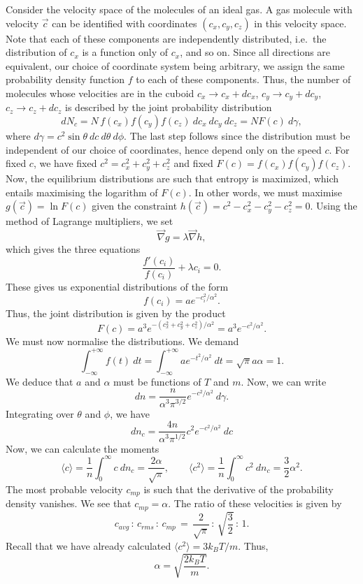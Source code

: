 \documentclass[11pt]{article}
\newcommand\ve[1]{\vec{#1}}
\newcommand\grad[1]{\ve{\nabla}#1}
\newcommand\E[1]{\langle #1 \rangle}
\theoremstyle{definition}
\theoremstyle{remark}
\numberwithin{equation}{section}
\begin{document}
    Consider the velocity space of the molecules of an ideal gas. A gas molecule
    with velocity $\ve{c}$ can be identified with coordinates $(c_x, c_y, c_z)$ in
    this velocity space. Note that each of these components are independently
    distributed, i.e.\ the distribution of $c_x$ is a function only of $c_x$, and so
    on. Since all directions are equivalent, our choice of coordinate system being
    arbitrary, we assign the same probability density function $f$ to each of these
    components. Thus, the number of molecules whose velocities are in the cuboid
    $c_x \to c_x + dc_x$, $c_y \to c_y + dc_y$, $c_z \to c_z + dc_z$ is described by
    the joint probability distribution \[
        dN_c = N\, f(c_x)f(c_y)f(c_z)\:dc_x\:dc_y\:dc_z = N F(c)\:d\gamma,
    \] where $d\gamma = c^2\sin\theta\:dc\:d\theta\:d\phi$.
    The last step follows since the distribution must be independent of our
    choice of coordinates, hence depend only on the speed $c$. For fixed $c$, we
    have fixed $c^2 = c_x^2 + c_y^2 + c_z^2$ and fixed $F(c) = f(c_x)f(c_y)f(c_z)$.
    Now, the equilibrium distributions are such that entropy is maximized, which
    entails maximising the logarithm of $F(c)$.  In other words, we must maximise
    $g(\vec{c}) = \ln{F(c)}$ given the constraint $h(\ve{c}) = c^2 - c_x^2 - c_y^2 -
    c_z^2 = 0$. Using the method of Lagrange multipliers, we set \[
        \grad{g} = \lambda \grad{h},
    \] which gives the three equations \[
        \frac{f'(c_i)}{f(c_i)} + \lambda c_i = 0.
    \] These gives us exponential distributions of the form \[
        f(c_i) = a e^{-c_i^2 / \alpha^2}.
    \] Thus, the joint distribution is given by the product \[
        F(c) = a^3e^{-(c_x^2 + c_y^2 + c_z^2) /\alpha^2} = a^3e^{-c^2 / \alpha^2}.
    \] We must now normalise the distributions. We demand \[
        \int_{-\infty}^{+\infty} f(t)\:dt = \int_{-\infty}^{+\infty} ae^{-t^2 /
        \alpha^2}\:dt = \sqrt{\pi}a\alpha = 1.
    \] We deduce that $a$ and $\alpha$ must be functions of $T$ and $m$.
    Now, we can write \[
        dn = \frac{n}{\alpha^3\pi^{3 / 2}} e^{-c^2 / \alpha^2} \:d\gamma.
    \] Integrating over $\theta$ and $\phi$, we have \[
        dn_c = \frac{4n}{\alpha^3\pi^{1 /2}} c^2 e^{-c^2 / \alpha^2} \:dc
    \] Now, we can calculate the moments \[
        \E{c} = \frac{1}{n}\int_0^\infty c\:dn_c = \frac{2\alpha}{\sqrt{\pi}}, \qquad
        \E{c^2} = \frac{1}{n}\int_0^\infty c^2\:dn_c = \frac{3}{2}\alpha^2.
    \] The most probable velocity $c_{mp}$ is such that the derivative of the
    probability density vanishes. We see that $c_{mp} = \alpha$.
    The ratio of these velocities is given by \[
        c_{avg} \,:\, c_{rms} \,:\, c_{mp} \,=\, 
            \frac{2}{\sqrt{\pi}} \,:\, \sqrt{\frac{3}{2}} \,:\, 1.
    \] Recall that we have already calculated $\E{c^2} = 3 k_B T /m$. Thus, \[
        \alpha = \sqrt{\frac{2k_B T}{m}}.
    \] 
\end{document}

